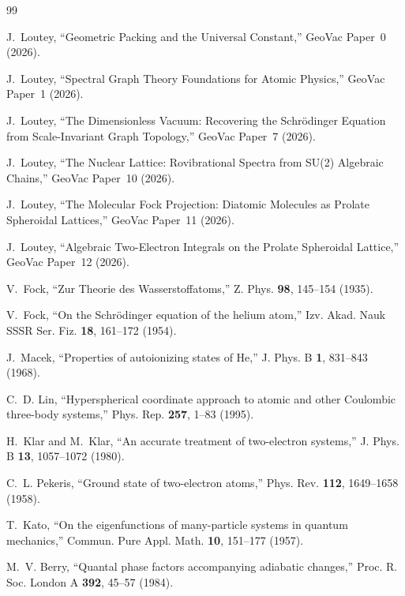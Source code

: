 \documentclass[aps,pra,twocolumn,superscriptaddress,longbibliography]{revtex4-2}
\begin{document}

\begin{thebibliography}{99}

J.~Loutey,
``Geometric Packing and the Universal Constant,''
GeoVac Paper~0 (2026).

J.~Loutey,
``Spectral Graph Theory Foundations for Atomic Physics,''
GeoVac Paper~1 (2026).

J.~Loutey,
``The Dimensionless Vacuum: Recovering the Schr\"odinger Equation
from Scale-Invariant Graph Topology,''
GeoVac Paper~7 (2026).

J.~Loutey,
``The Nuclear Lattice: Rovibrational Spectra from SU(2) Algebraic
Chains,''
GeoVac Paper~10 (2026).

J.~Loutey,
``The Molecular Fock Projection: Diatomic Molecules as Prolate
Spheroidal Lattices,''
GeoVac Paper~11 (2026).

J.~Loutey,
``Algebraic Two-Electron Integrals on the Prolate Spheroidal
Lattice,''
GeoVac Paper~12 (2026).

V.~Fock,
``Zur Theorie des Wasserstoffatoms,''
Z. Phys. \textbf{98}, 145--154 (1935).

V.~Fock,
``On the Schr\"odinger equation of the helium atom,''
Izv. Akad. Nauk SSSR Ser. Fiz. \textbf{18}, 161--172 (1954).

J.~Macek,
``Properties of autoionizing states of He,''
J. Phys. B \textbf{1}, 831--843 (1968).

C.~D. Lin,
``Hyperspherical coordinate approach to atomic and other Coulombic
three-body systems,''
Phys. Rep. \textbf{257}, 1--83 (1995).

H.~Klar and M.~Klar,
``An accurate treatment of two-electron systems,''
J. Phys. B \textbf{13}, 1057--1072 (1980).

C.~L. Pekeris,
``Ground state of two-electron atoms,''
Phys. Rev. \textbf{112}, 1649--1658 (1958).

T.~Kato,
``On the eigenfunctions of many-particle systems in quantum
mechanics,''
Commun. Pure Appl. Math. \textbf{10}, 151--177 (1957).

M.~V. Berry,
``Quantal phase factors accompanying adiabatic changes,''
Proc. R. Soc. London A \textbf{392}, 45--57 (1984).


\end{thebibliography}
\end{document}
